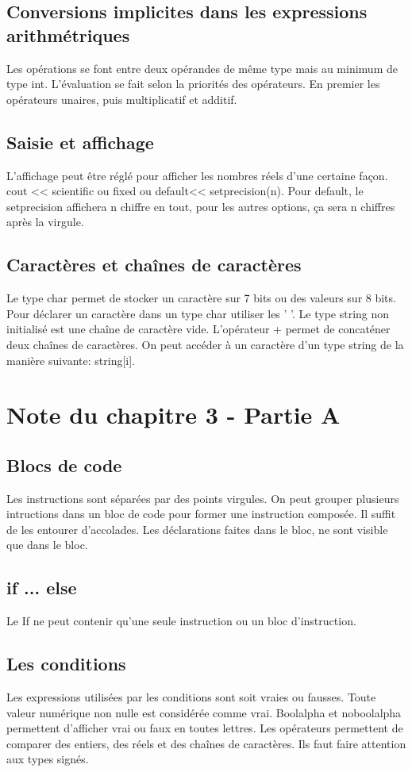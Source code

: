 \documentclass{article}
\begin{document}
\subsection{Conversions implicites dans les expressions arithmétriques}
Les opérations se font entre deux opérandes de même type mais au minimum de type int. L'évaluation se fait selon la priorités des opérateurs. En premier les opérateurs unaires, puis multiplicatif et additif. 

\subsection{Saisie et affichage}
L'affichage peut être réglé pour afficher les nombres réels d'une certaine façon. cout << scientific ou fixed ou default<< setprecision(n). Pour default, le setprecision affichera n chiffre en tout, pour les autres options, ça sera n chiffres après la virgule. 
\subsection{Caractères et chaînes de caractères}
Le type char permet de stocker un caractère sur 7 bits ou des valeurs sur 8 bits. Pour déclarer un caractère dans un type char utiliser les ' '. Le type string non initialisé est une chaîne de caractère vide. L'opérateur + permet de concaténer deux chaînes de caractères. On peut accéder à un caractère d'un type string de la manière suivante: string[i]. 

\section{Note du chapitre 3 - Partie A}
\subsection{Blocs de code}
Les instructions sont séparées par des points virgules. On peut grouper plusieurs intructions dans un bloc de code pour former une instruction composée. Il suffit de les entourer d'accolades. Les déclarations faites dans le bloc, ne sont visible que dans le bloc. 
\subsection{if ... else}
Le If ne peut contenir qu'une seule instruction ou un bloc d'instruction.  

\subsection{Les conditions}
Les expressions utilisées par les conditions sont soit vraies ou fausses. Toute valeur numérique non nulle est considérée comme vrai. Boolalpha et noboolalpha permettent d'afficher vrai ou faux en toutes lettres. Les opérateurs permettent de comparer des entiers, des réels et des chaînes de caractères. Ils faut faire attention aux types signés. 
\end{document}
